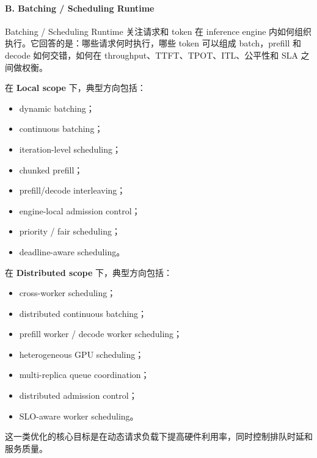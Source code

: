 \documentclass[a4paper,10pt]{ctexart}
\begin{document}
\paragraph*{B. Batching / Scheduling Runtime}

Batching / Scheduling Runtime 关注请求和 token 在 inference engine 内如何组织执行。它回答的是：哪些请求何时执行，哪些 token 可以组成 batch，prefill 和 decode 如何交错，如何在 throughput、TTFT、TPOT、ITL、公平性和 SLA 之间做权衡。


在 \textbf{Local scope} 下，典型方向包括：


\begin{itemize}
\item dynamic batching；

\item continuous batching；

\item iteration-level scheduling；

\item chunked prefill；

\item prefill/decode interleaving；

\item engine-local admission control；

\item priority / fair scheduling；

\item deadline-aware scheduling。

\end{itemize}
在 \textbf{Distributed scope} 下，典型方向包括：


\begin{itemize}
\item cross-worker scheduling；

\item distributed continuous batching；

\item prefill worker / decode worker scheduling；

\item heterogeneous GPU scheduling；

\item multi-replica queue coordination；

\item distributed admission control；

\item SLO-aware worker scheduling。

\end{itemize}
这一类优化的核心目标是在动态请求负载下提高硬件利用率，同时控制排队时延和服务质量。
\end{document}
